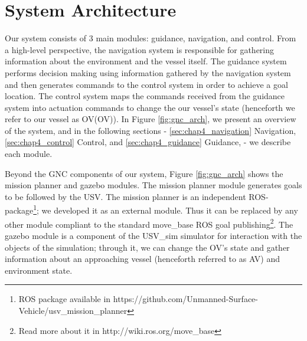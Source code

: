 \section{System Architecture}
\label{sec:sys_arch}

    Our system consists of 3 main modules: guidance, navigation, and control. From a high-level perspective, the navigation system is responsible for gathering information about the environment and the vessel itself. The guidance system performs decision making using information gathered by the navigation system and then generates commands to the control system in order to achieve a goal location. The control system maps the commands received from the guidance system into actuation commands to change the our vessel's state (henceforth we refer to our vessel as \acl{OV}(\ac{OV})). In Figure \ref{fig:gnc_arch}, we present an overview of the system, and in the following sections - \ref{sec:chap4_navigation} Navigation, \ref{sec:chap4_control} Control, and \ref{sec:chap4_guidance} Guidance, - we describe each module.

    Beyond the \ac{GNC} components of our system, Figure \ref{fig:gnc_arch} shows the mission planner and gazebo modules. The mission planner module generates goals to be followed by the \ac{USV}. The mission planner is an independent ROS-package\footnote{ROS package available in https://github.com/Unmanned-Surface-Vehicle/usv\_mission\_planner}; we developed it as an external module. Thus it can be replaced by any other module compliant to the standard move\_base ROS goal publishing\footnote{Read more about it in http://wiki.ros.org/move\_base}. The gazebo module is a component of the USV\_sim simulator for interaction with the objects of the simulation; through it, we can change the \ac{OV}'s state and gather information about an approaching vessel (henceforth referred to as \ac{AV}) and environment state.

